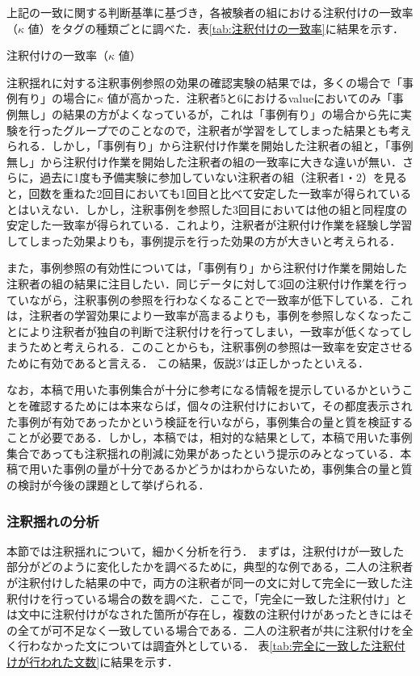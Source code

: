 \documentclass[japanese]{jnlp_1.4}
\begin{document}
上記の一致に関する判断基準に基づき，各被験者の組における注釈付けの一致率（$\kappa$ 値）をタグの種類ごとに調べた．表\ref{tab:注釈付けの一致率}に結果を示す．

\begin{table}[b]
\caption{注釈付けの一致率（$\kappa$ 値）}
\label{tab:注釈付けの一致率}

\end{table}

注釈揺れに対する注釈事例参照の効果の確認実験の結果では，多くの場合で「事例有り」の場合に$\kappa$ 値が高かった．注釈者5と6におけるvalueにおいてのみ「事例無し」の結果の方がよくなっているが，これは「事例有り」の場合から先に実験を行ったグループでのことなので，注釈者が学習をしてしまった結果とも考えられる．しかし，「事例有り」から注釈付け作業を開始した注釈者の組と，「事例無し」から注釈付け作業を開始した注釈者の組の一致率に大きな違いが無い．さらに，過去に1度も予備実験に参加していない注釈者の組（注釈者1・2）を見ると，回数を重ねた2回目においても1回目と比べて安定した一致率が得られているとはいえない．しかし，注釈事例を参照した3回目においては他の組と同程度の安定した一致率が得られている．これより，注釈者が注釈付け作業を経験し学習してしまった効果よりも，事例提示を行った効果の方が大きいと考えられる．

また，事例参照の有効性については，「事例有り」から注釈付け作業を開始した注釈者の組の結果に注目したい．同じデータに対して3回の注釈付け作業を行っていながら，注釈事例の参照を行わなくなることで一致率が低下している．これは，注釈者の学習効果により一致率が高まるよりも，事例を参照しなくなったことにより注釈者が独自の判断で注釈付けを行ってしまい，一致率が低くなってしまうためと考えられる．このことからも，注釈事例の参照は一致率を安定させるために有効であると言える．
この結果，仮説3$'$は正しかったといえる．

なお，本稿で用いた事例集合が十分に参考になる情報を提示しているかということを確認するためには本来ならば，個々の注釈付けにおいて，その都度表示された事例が有効であったかという検証を行いながら，事例集合の量と質を検証することが必要である．しかし，本稿では，相対的な結果として，本稿で用いた事例集合であっても注釈揺れの削減に効果があったという提示のみとなっている．本稿で用いた事例の量が十分であるかどうかはわからないため，事例集合の量と質の検討が今後の課題として挙げられる．


\subsubsection{注釈揺れの分析}
\label{sec:注釈揺れの分析}

本節では注釈揺れについて，細かく分析を行う．
まずは，注釈付けが一致した部分がどのように変化したかを調べるために，典型的な例である，二人の注釈者が注釈付けした結果の中で，両方の注釈者が同一の文に対して完全に一致した注釈付けを行っている場合の数を調べた．ここで，「完全に一致した注釈付け」とは文中に注釈付けがなされた箇所が存在し，複数の注釈付けがあったときにはその全てが可不足なく一致している場合である．二人の注釈者が共に注釈付けを全く行わなかった文については調査外としている．
表\ref{tab:完全に一致した注釈付けが行われた文数}に結果を示す．
\end{document}
